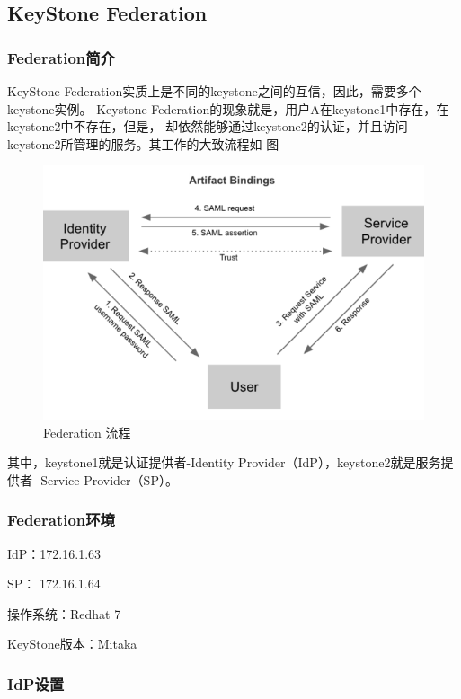 \subsection{KeyStone Federation}

\subsubsection{Federation简介}
KeyStone Federation实质上是不同的keystone之间的互信，因此，需要多个keystone实例。
Keystone Federation的现象就是，用户A在keystone1中存在，在keystone2中不存在，但是，
却依然能够通过keystone2的认证，并且访问keystone2所管理的服务。其工作的大致流程如
图 

\begin{figure}[H]
  \centering
  \includegraphics[width=\linewidth]{k2k_auth.png}
  \caption{Federation 流程\protect\footnotemark}
  \label{fig:k2k_auth}
\end{figure}

其中，keystone1就是认证提供者-Identity Provider（IdP），keystone2就是服务提供者-
Service Provider（SP）。

\subsubsection{Federation环境}
IdP：172.16.1.63

SP： 172.16.1.64

操作系统：Redhat 7

KeyStone版本：Mitaka

\subsubsection{IdP设置}

